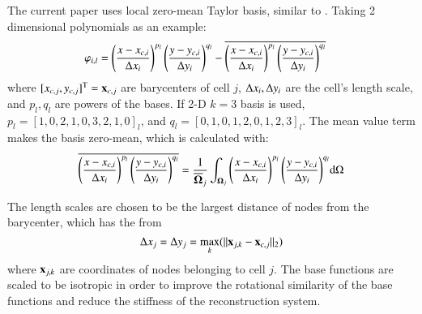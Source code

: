\documentclass[preprint,12pt]{elsarticle}
\begin{document}
The current paper uses local zero-mean Taylor basis, similar to
\cite{wang2017compact_VR}.
Taking 2 dimensional polynomials as an example:
\begin{equation}
    \begin{aligned}
        \varphi_{i,l} & =
        \left(\frac{x - x_{c,i}}{\mathrm\Delta x_i}\right)^{p_l}
        \left(\frac{y - y_{c,i}}{\mathrm\Delta y_i}\right)^{q_l}
        -
        \overline{
            \left(\frac{x - x_{c,i}}{\mathrm\Delta x_i}\right)^{p_l}
            \left(\frac{y - y_{c,i}}{\mathrm\Delta y_i}\right)^{q_l}
        }
    \end{aligned}
\end{equation}
where $[x_{c,j},y_{c,j}]^\mathrm{T} = \mathbf{x}_{c,j}$ are barycenters of cell $j$,
$\mathrm\Delta x_i,\mathrm\Delta y_i$ are the cell's length scale, and $p_l,q_l$ are
powers of the bases. If 2-D $k=3$ basis is used, $p_l=[1,0,2,1,0,3,2,1,0]_l$,
and $q_l=[0,1,0,1,2,0,1,2,3]_l$.
The mean value term makes the basis zero-mean, which is calculated with:
\begin{equation}
    \overline{
        \left(\frac{x - x_{c,i}}{\mathrm\Delta x_i}\right)^{p_l}
        \left(\frac{y - y_{c,i}}{\mathrm\Delta y_i}\right)^{q_l}
    }
    =
    \frac{1}{\overline{\mathbf{\Omega}}_j}\int_{\mathbf{\Omega}_j}{
        \left(\frac{x - x_{c,i}}{\mathrm\Delta x_i}\right)^{p_l}
        \left(\frac{y - y_{c,i}}{\mathrm\Delta y_i}\right)^{q_l}
    }\dd \Omega
\end{equation}

The length scales are chosen to be the largest distance of nodes from the
barycenter, which has the from
\begin{equation}
    \mathrm\Delta x_j = \mathrm\Delta y_j = \max_k(\|\mathbf{x}_{j,k} - \mathbf{x}_{c,j}\|_2)
\end{equation}
where $\mathbf{x}_{j,k}$ are coordinates of nodes belonging to cell $j$.
The base functions are scaled to be isotropic in order
to improve the rotational similarity of the base functions
and reduce the stiffness of the reconstruction system.
\end{document}
